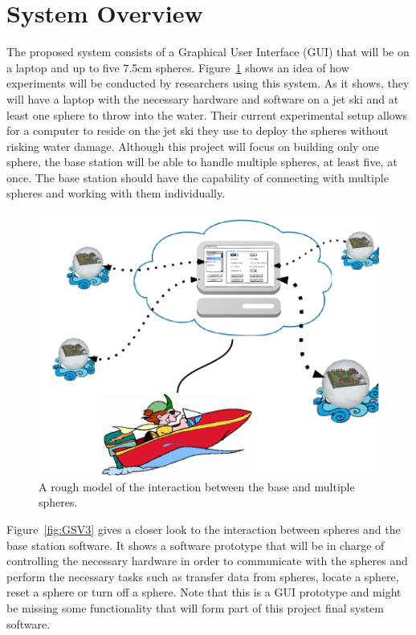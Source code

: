 \section{System Overview}


The proposed system consists of a Graphical User Interface (GUI) that will be on a laptop and up to five 7.5cm spheres.  Figure~\ref{fig:GSV2} shows an idea of how experiments will be conducted by researchers using this system.  As it shows, they will have a laptop with the necessary hardware and software on a jet ski and at least one sphere to throw into the water.  Their current experimental setup allows for a computer to reside on the jet ski they use to deploy the spheres without risking water damage.  Although this project will focus on building only one sphere, the base station will be able to handle multiple spheres, at least five, at once.  The base station should have the capability of connecting with multiple spheres and working with them individually.

\begin{figure}[H]
	\centering
	\includegraphics[scale=0.6]{img/GSV2}
	\caption{A rough model of the interaction between the base and multiple spheres. \label{fig:GSV2}}
\end{figure}

Figure~\ref{fig:GSV3} gives a closer look to the interaction between spheres and the base station software.  It shows a software prototype that will be in charge of controlling the necessary hardware in order to communicate with the spheres and perform the necessary tasks such as transfer data from spheres, locate a sphere, reset a sphere or turn off a sphere.  Note that this is a GUI prototype and might be missing some functionality that will form part of this project final system software.  

